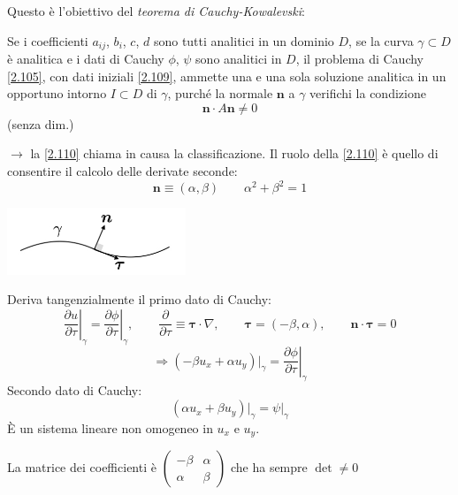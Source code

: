 \documentclass[a4paper,11pt]{report}
\newcommand{\vect}[1]{\boldsymbol{#1}}
\begin{document}
\smallskip

Questo \`e l'obiettivo del \emph{teorema di Cauchy-Kowalevski}: 

Se i coefficienti $a_{ij}$, $b_i$, $c$, $d$ sono tutti analitici in un dominio $D$, se la curva $\gamma \subset D$ \`e analitica e i dati di Cauchy $\phi$, $\psi$ sono analitici in $D$, il problema di Cauchy \eqref{2.105}, con dati iniziali \eqref{2.109}, ammette una e una sola soluzione analitica in un opportuno intorno $I\subset D$ di $\gamma$, purch\'e la normale $\vect{n}$ a $\gamma$ verifichi la condizione 
\begin{equation}
\vect{n}\cdot A \vect{n}\neq 0
\label{2.110}
\end{equation}
(senza dim.)

\smallskip

$\rightarrow$ la \eqref{2.110} chiama in causa la classificazione.
Il ruolo della \eqref{2.110} \`e quello di consentire il calcolo delle derivate seconde:
\[
\vect{n}\equiv (\alpha,\beta) \qquad \alpha^2 + \beta^2 =1
\]
\begin{center}
\includegraphics[width=0.4\textwidth]{immagini/curva2}
\end{center}

Deriva tangenzialmente il primo dato di Cauchy:
\[
\left.\frac{\partial u}{\partial \tau}\right|_{\gamma} = \left. \frac{\partial \phi}{\partial \tau}\right|_{\gamma}, \qquad
\frac{\partial}{\partial \tau} \equiv \vect{\tau}\cdot \nabla, \qquad 
\vect{\tau}= (-\beta,\alpha), \qquad 
\vect{n} \cdot \vect{\tau} = 0
\]
\begin{equation}
\Rightarrow (-\beta u_x +\alpha u_y) \big|_{\gamma}=\left.\frac{\partial \phi}{\partial \tau}\right|_{\gamma}
\label{2.111}
\end{equation}
Secondo dato di Cauchy:
\begin{equation}
(\alpha u_x + \beta u_y) \big|_{\gamma} = \psi |_{\gamma}
\label{2.112}
\end{equation}
\`E un sistema lineare non omogeneo in $u_x$ e $u_y$.

La matrice dei coefficienti \`e $\left( \begin{matrix} -\beta & \alpha \\ \alpha & \beta \end{matrix} \right)$ che ha sempre $\det\neq0$
\end{document}
